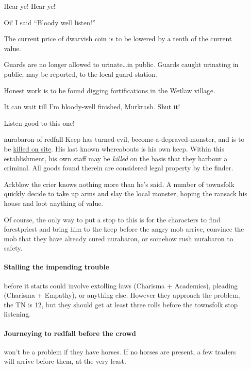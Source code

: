 \begin{speechtext}

    Hear ye! Hear ye!

    Oi! I said ``Bloody well listen!''

    The current price of dwarvish coin is to be lowered by a tenth of the current value.

    Guards are no longer allowed to urinate\ldots in public.
    Guards caught urinating in public, may be reported, to the local {\footnotesize guard station}.

    Honest work is to be found digging fortifications in the Wetlaw village.

    It can wait till I'm bloody-well finished, Murkrash.
    Shut it!

    Listen good to this one!

    \gls{nurabaron} of \gls{redfall} Keep has turned-evil, become-a-depraved-monster, and is to be \underline{\large killed on site}.
    His last known whereabouts is his own keep.
    Within this establishment, his own staff may be \emph{killed} on the basis that they harbour a criminal.
    All goods found therein are considered legal property by the finder.

\end{speechtext}

Arkblow the crier knows nothing more than he's said.  A number of townsfolk quickly decide to take up arms and slay the local monster, hoping the ransack his house and loot anything of value.

Of course, the only way to put a stop to this is for the characters to find \gls{forestpriest} and bring him to the keep before the angry mob arrive, convince the mob that they have already cured \gls{nurabaron}, or somehow rush \gls{nurabaron} to safety.

\paragraph{Stalling the impending trouble}
before it starts could involve extolling laws (Charisma + Academics), pleading (Charisma + Empathy), or anything else.
However they approach the problem, the TN is 12, but they should get at least three rolls before the townsfolk stop listening.

\paragraph{Journeying to \gls{redfall} before the crowd}
won't be a problem if they have horses.
If no horses are present, a few traders will arrive before them, at the very least.

